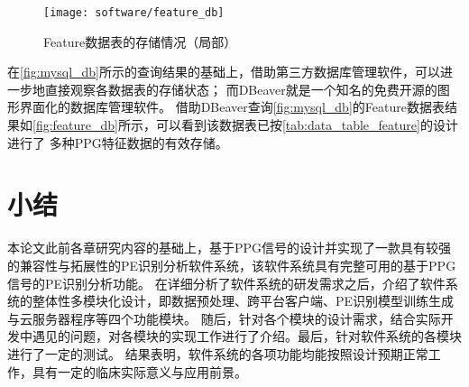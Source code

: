 \begin{figure}[htbp]
    \centering
    \texttt{[image: software/feature\_db]}
    \caption[Feature数据表的存储情况（局部）]{\label{fig:feature_db}Feature数据表的存储情况（局部）}
\end{figure}

在\autoref{fig:mysql_db}所示的查询结果的基础上，借助第三方数据库管理软件，可以进一步地直接观察各数据表的存储状态；
而DBeaver就是一个知名的免费开源的图形界面化的数据库管理软件。
借助DBeaver查询\autoref{fig:mysql_db}的Feature数据表结果如\autoref{fig:feature_db}所示，可以看到该数据表已按\autoref{tab:data_table_feature}的设计进行了
多种PPG特征数据的有效存储。

\section{小结}
本论文此前各章研究内容的基础上，基于PPG信号的设计并实现了一款具有较强的兼容性与拓展性的PE识别分析软件系统，该软件系统具有完整可用的基于PPG信号的PE识别分析功能。
在详细分析了软件系统的研发需求之后，介绍了软件系统的整体性多模块化设计，即数据预处理、跨平台客户端、PE识别模型训练生成与云服务器程序等四个功能模块。
随后，针对各个模块的设计需求，结合实际开发中遇见的问题，对各模块的实现工作进行了介绍。最后，针对软件系统的各模块进行了一定的测试。
结果表明，软件系统的各项功能均能按照设计预期正常工作，具有一定的临床实际意义与应用前景。
